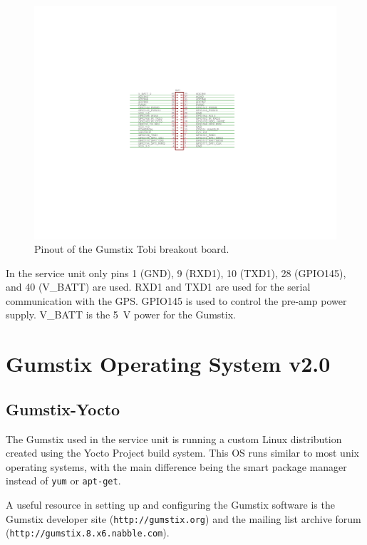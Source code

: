 \begin{figure}[ht!]
   \centering
   \includegraphics[scale=1]{Appendix/Figures/tobi_pinout.pdf}
   \caption{Pinout of the Gumstix Tobi breakout board.}
   \label{app:gumstix:fig:tobi}
\end{figure}

In the service unit only pins 1 (GND), 9 (RXD1), 10 (TXD1), 28 (GPIO145), and 40 (V\_BATT) are used.
RXD1 and TXD1 are used for the serial communication with the GPS.
GPIO145 is used to control the pre-amp power supply.
V\_BATT is the 5~V power for the Gumstix.

\section{Gumstix Operating System v2.0}

\subsection{Gumstix-Yocto}

The Gumstix used in the service unit is running a custom Linux distribution created using the Yocto Project build system.
This OS runs similar to most unix operating systems, with the main difference being the smart package manager instead of \texttt{yum} or \texttt{apt-get}.

A useful resource in setting up and configuring the Gumstix software is the Gumstix developer site (\texttt{http://gumstix.org}) and the mailing list archive forum (\texttt{http://gumstix.8.x6.nabble.com}).

